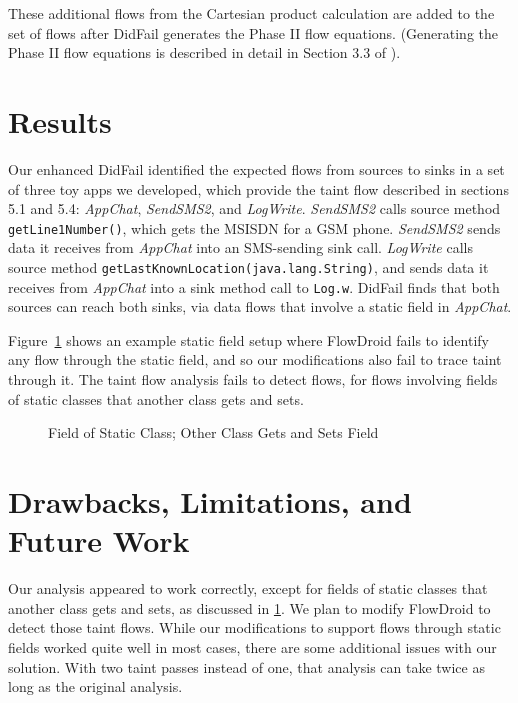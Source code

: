 These additional flows from the Cartesian product calculation are added to the set of flows after DidFail generates the Phase II flow equations. (Generating the Phase II flow equations is described in detail in Section 3.3 of \cite{didfail}). 

\section{Results} \label{sec:static-results}
Our enhanced DidFail identified the expected flows from sources to sinks in a set of three toy apps we developed, which provide the taint flow described in sections 5.1 and 5.4: \emph{AppChat}, \emph{SendSMS2}, and \emph{LogWrite}. \emph{SendSMS2} calls source method \texttt{getLine1Number()},  which gets the MSISDN for a GSM phone.  \emph{SendSMS2} sends data it receives from \emph{AppChat} into an SMS-sending sink call. \emph{LogWrite} calls source method \texttt{getLastKnownLocation(java.lang.String)}, and sends data it receives from \emph{AppChat} into a sink method call to \texttt{Log.w}. DidFail finds that both sources can reach both sinks, via  data flows that involve a static field in \emph{AppChat}. 

Figure~\ref{fig:staticAnalysisProblem} shows an example static field setup where FlowDroid fails to identify any flow through the static field, and so our modifications also fail to trace taint through it.  The taint flow analysis fails to detect flows, for flows involving fields of static classes that another class gets and sets.

\begin{figure}
\begin{framed}
\begin{center}
\begin{minipage}{0.85\textwidth}

\end{minipage}
\end{center}
\caption{Field of Static Class; Other Class Gets and Sets Field}
\label{fig:staticAnalysisProblem}
\end{framed}
\end{figure}


\section{Drawbacks, Limitations, and Future Work}

Our analysis appeared to work correctly, except for fields of static classes that another class gets and sets, as discussed in \ref{sec:static-results}. We plan to modify FlowDroid to detect those taint flows. While our modifications to support flows through static fields worked quite well in most cases, there are some additional issues with our solution. With two taint passes instead of one, that analysis can take twice as long as the original analysis. 

